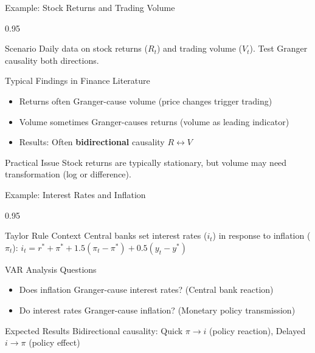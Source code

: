 \documentclass[9pt, aspectratio=169, t]{beamer}
\begin{document}
\begin{frame}{Example: Stock Returns and Trading Volume}
    \begin{cminipage}{0.95\textwidth}
    {\small
    \begin{block}{Scenario}
        Daily data on stock returns ($R_t$) and trading volume ($V_t$). Test Granger causality both directions.
    \end{block}
    \begin{exampleblock}{Typical Findings in Finance Literature}
        \begin{itemize}\setlength{\itemsep}{0pt}
            \item Returns often Granger-cause volume (price changes trigger trading)
            \item Volume sometimes Granger-causes returns (volume as leading indicator)
            \item Results: Often \textbf{bidirectional} causality $R \leftrightarrow V$
        \end{itemize}
    \end{exampleblock}
    \begin{block}{Practical Issue}
        Stock returns are typically stationary, but volume may need transformation (log or difference).
    \end{block}
    }
    \end{cminipage}
\end{frame}

\begin{frame}{Example: Interest Rates and Inflation}
    \begin{cminipage}{0.95\textwidth}
    {\small
    \begin{block}{Taylor Rule Context}
        Central banks set interest rates ($i_t$) in response to inflation ($\pi_t$):
        $i_t = r^* + \pi^* + 1.5(\pi_t - \pi^*) + 0.5(y_t - y^*)$
    \end{block}
    \begin{exampleblock}{VAR Analysis Questions}
        \begin{itemize}\setlength{\itemsep}{0pt}
            \item Does inflation Granger-cause interest rates? (Central bank reaction)
            \item Do interest rates Granger-cause inflation? (Monetary policy transmission)
        \end{itemize}
    \end{exampleblock}
    \begin{block}{Expected Results}
        Bidirectional causality: Quick $\pi \to i$ (policy reaction), Delayed $i \to \pi$ (policy effect)
    \end{block}
    }
    \end{cminipage}
\end{frame}
\end{document}
